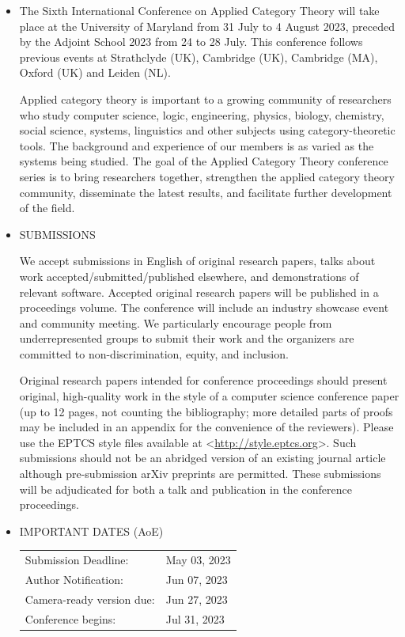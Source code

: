 \documentclass[prodmode,acmtecs]{acmsmall} %
\begin{document}
\begin{itemize}\item  The Sixth International Conference on Applied Category Theory will take place at the University of Maryland from 31 July to 4 August 2023, preceded by the Adjoint School 2023 from 24 to 28 July. This conference follows previous events at Strathclyde (UK), Cambridge (UK), Cambridge (MA), Oxford (UK) and Leiden (NL).  
 
  Applied category theory is important to a growing community of researchers who study computer science, logic, engineering, physics, biology, chemistry, social science, systems, linguistics and other subjects using category-theoretic tools.  The background and experience of our members is as varied as the systems being studied. The goal of the Applied Category Theory conference series is to bring researchers together, strengthen the applied category theory community, disseminate the latest results, and facilitate further development of the field. 
 
\item  SUBMISSIONS  
 
  We accept submissions in English of original research papers, talks about work accepted/submitted/published elsewhere, and demonstrations of relevant software. Accepted original research papers will be published in a proceedings volume. The conference will include an industry showcase event and community meeting. We particularly encourage people from underrepresented groups to submit their work and the organizers are committed to non-discrimination, equity, and inclusion.  
 
  Original research papers intended for conference proceedings should present original, high-quality work in the style of a computer science conference paper (up to 12 pages, not counting the bibliography; more detailed parts of proofs may be included in an appendix for the convenience of the reviewers). Please use the EPTCS style files available at <\href{http://style.eptcs.org}{http://style.eptcs.org}>. Such submissions should not be an abridged version of an existing journal article although pre-submission arXiv preprints are permitted. These submissions will be adjudicated for both a talk and publication in the conference proceedings.  
 
\item  IMPORTANT DATES (AoE) 
 
\begin{tabulary}{\linewidth}{LL}Submission Deadline:  & May 03, 2023 \\
Author Notification:  & Jun 07, 2023 \\
Camera-ready version due:  & Jun 27, 2023 \\
Conference begins:  & Jul 31, 2023 \\
\end{tabulary}
 

\end{itemize}
\end{document}
